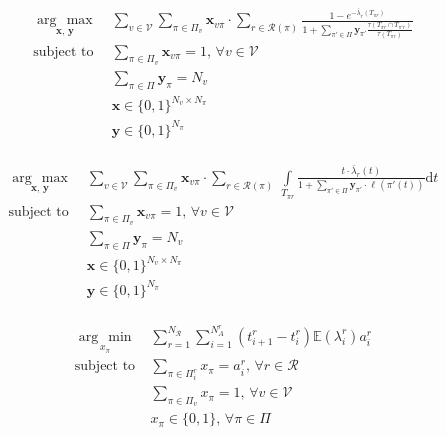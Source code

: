 \documentclass[letterpaper, 10pt, conference]{ieeeconf}
\newcommand{\argmin}[1]{\underset{#1}{\operatorname{arg}\,\operatorname{min}}\;}
\newcommand{\argmax}[1]{\underset{#1}{\operatorname{arg}\,\operatorname{max}}\;}
\newcommand{\Sum}[1]{\displaystyle\sum\limits_{#1}}
\newcommand{\Int}[1]{\displaystyle\int\limits_{#1}}
\newcommand{\bx}[0]{\ensuremath{\mathbf{x}}}
\newcommand{\by}[0]{\ensuremath{\mathbf{y}}}
\begin{document}
\begin{equation*}
\begin{array}{lll}
\argmax{\bx, \, \by}  & \Sum{v \in \mathcal{V}}
    \Sum{\pi \in \Pi_v} \bx_{v\pi} \cdot
    \Sum{r \in \mathcal{R}(\pi)}
    \frac{1 - e^{-\bar{\lambda}_r(T_{\pi r})}}
    {1 + \Sum{\pi' \in \Pi} \by_{\pi'} \frac{\tau(T_{\pi r} \cap T_{\pi' r})}
    {\tau(T_{\pi r})}}& \\
\text{subject to}
    & \Sum{\pi \in \Pi_v} \bx_{v\pi} = 1, \, \forall v \in \mathcal{V} \\
    & \Sum{\pi \in \Pi} \by_{\pi} = N_v \\
    & \bx \in \{0, 1\} ^ {N_v \times N_\pi} \\
    & \by \in \{0, 1\} ^ {N_\pi} \\

\end{array}
\end{equation*}

\begin{equation*}
\begin{array}{lll}
\argmax{\bx, \, \by}  & \Sum{v \in \mathcal{V}}
    \Sum{\pi \in \Pi_v} \bx_{v\pi} \cdot
    \Sum{r \in \mathcal{R}(\pi)} \,
    \Int{T_{\pi r}}
    \frac{t \cdot \bar{\lambda}_r(t)}
    {1 + \sum\limits_{\pi' \in \Pi} \by_{\pi'} \cdot \ell(\pi'(t))} \text{d}t& \\
\text{subject to}
    & \Sum{\pi \in \Pi_v} \bx_{v\pi} = 1, \, \forall v \in \mathcal{V} \\
    & \Sum{\pi \in \Pi} \by_{\pi} = N_v \\
    & \bx \in \{0, 1\} ^ {N_v \times N_\pi} \\
    & \by \in \{0, 1\} ^ {N_\pi} \\
\end{array}
\end{equation*}

\begin{equation*}
\begin{array}{lll}
\argmin{x_\pi}  & \Sum{r = 1}^{N_{\mathcal{R}}}
    \Sum{i = 1}^{N^r_A} (t^r_{i + 1} - t^r_i) \mathbb{E}({\lambda}^r_i) a^r_i & \\
\text{subject to}
    & \Sum{\pi \in \Pi^r_i} x_{\pi} = a^r_i, \, \forall r \in \mathcal{R} \\
    & \Sum{\pi \in \Pi_v} x_{\pi} = 1, \, \forall v \in \mathcal{V} \\
    & x_\pi \in \{0, 1\}, \, \forall \pi \in \Pi
\end{array}
\end{equation*}





\end{document}
